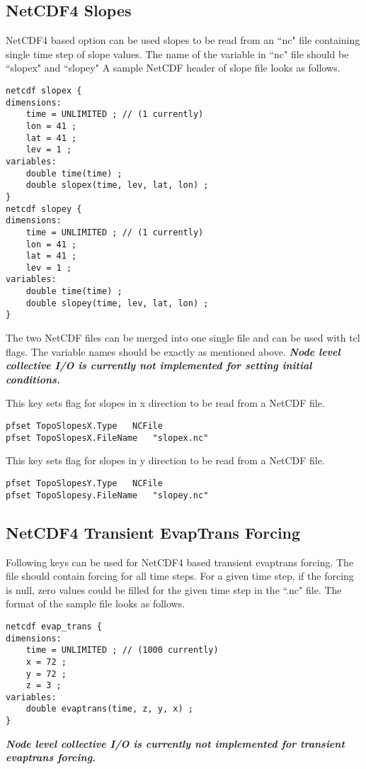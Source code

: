 \subsection{NetCDF4 Slopes}
NetCDF4 based option can be used slopes to be read from an ``nc" file containing single time step of slope values. The name of the variable in ``nc" file should be ``slopex" and ``slopey" A sample NetCDF header of slope file looks as follows.
\begin{display}\begin{verbatim}
netcdf slopex {
dimensions:
	time = UNLIMITED ; // (1 currently)
	lon = 41 ;
	lat = 41 ;
	lev = 1 ;
variables:
  	double time(time) ;
	double slopex(time, lev, lat, lon) ;
}
netcdf slopey {
dimensions:
	time = UNLIMITED ; // (1 currently)
	lon = 41 ;
	lat = 41 ;
	lev = 1 ;
variables:
	double time(time) ;
	double slopey(time, lev, lat, lon) ;
}
\end{verbatim}\end{display}
The two NetCDF files can be merged into one single file and can be used with tcl flags. The variable names should be exactly as mentioned above.
\textit{\textbf{Node level collective I/O is currently not implemented for setting initial conditions.}}

{This key sets flag for slopes in x direction to be read from a NetCDF file.} 
\begin{display}\begin{verbatim}
pfset TopoSlopesX.Type   NCFile
pfset TopoSlopesX.FileName   "slopex.nc"
\end{verbatim}\end{display}
{This key sets flag for slopes in y direction to be read from a NetCDF file.} 
\begin{display}\begin{verbatim}
pfset TopoSlopesY.Type   NCFile
pfset TopoSlopesy.FileName   "slopey.nc"
\end{verbatim}\end{display}

\subsection{NetCDF4 Transient EvapTrans Forcing}
Following keys can be used for NetCDF4 based transient evaptrans forcing. The file should contain forcing for all time steps. For a given time step, if the forcing is null, zero values could be filled for the given time step in the ``.nc" file. The format of the sample file looks as follows.
\begin{display}\begin{verbatim}
netcdf evap_trans {
dimensions:
	time = UNLIMITED ; // (1000 currently)
	x = 72 ;
	y = 72 ;
	z = 3 ;
variables:
	double evaptrans(time, z, y, x) ;
}
\end{verbatim}\end{display}
\textit{\textbf{Node level collective I/O is currently not implemented for transient evaptrans forcing.}}

